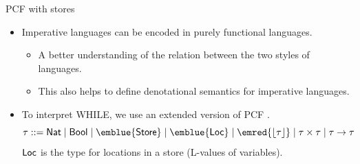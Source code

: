 \documentclass[paper=screen,mode=present,style=zysimple]{powerdot}
\begin{document}
\begin{slide}{PCF with stores}
\begin{itemize}
\item Imperative languages can be encoded in purely functional languages. \\
\begin{itemize}
\item A better understanding of the relation between the two styles of languages. \\
\item This also helps to define denotational semantics for imperative languages.
\vspace*{-0.5em}
\end{itemize}
\item To interpret WHILE, we use an extended version of PCF .
\[
\tau ::= \tnat \mid \tbool \mid \emblue{\tstore} \mid \emblue{\tloc} \mid \emred{\tlift{\tau}}
\mid \tau \times \tau \mid \tau \to \tau
\]
$\mathsf{Loc}$ is the type for locations in a store (L-values of variables). \\[0.3em]
\end{itemize}
\end{slide}
\end{document}
